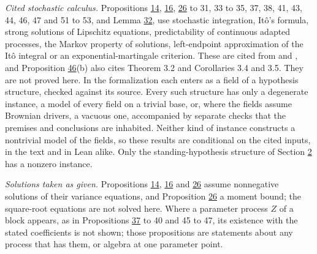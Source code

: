 \documentclass[11pt]{article}
\begin{document}
\emph{Cited stochastic calculus.} Propositions \hyperref[res:Proposition-14]{14}, \hyperref[res:Proposition-16]{16}, \hyperref[res:Proposition-26]{26} to 31, 33 to 35, 37, 38, 41, 43, 44, 46, 47 and 51 to 53, and Lemma \hyperref[res:Lemma-32]{32}, use stochastic integration, Itô's formula, strong solutions of Lipschitz equations, predictability of continuous adapted processes, the Markov property of solutions, left-endpoint approximation of the Itô integral or an exponential-martingale criterion. These are cited from \cite{bauerschmidt2020stochastic} and \cite{vanhandel2007stochastic}, and Proposition \hyperref[res:Proposition-46]{46}(b) also cites \cite{filipovic2000exponential} Theorem 3.2 and Corollaries 3.4 and 3.5. They are not proved here. In the formalization each enters as a field of a hypothesis structure, checked against its source. Every such structure has only a degenerate instance, a model of every field on a trivial base, or, where the fields assume Brownian drivers, a vacuous one, accompanied by separate checks that the premises and conclusions are inhabited. Neither kind of instance constructs a nontrivial model of the fields, so these results are conditional on the cited inputs, in the text and in Lean alike. Only the standing-hypothesis structure of Section \hyperref[sec:2]{2} has a nonzero instance.

\emph{Solutions taken as given.} Propositions \hyperref[res:Proposition-14]{14}, \hyperref[res:Proposition-16]{16} and \hyperref[res:Proposition-26]{26} assume nonnegative solutions of their variance equations, and Proposition \hyperref[res:Proposition-26]{26} a moment bound; the square-root equations are not solved here. Where a parameter process \(Z\) of a block appears, as in Propositions \hyperref[res:Proposition-37]{37} to 40 and 45 to 47, its existence with the stated coefficients is not shown; those propositions are statements about any process that has them, or algebra at one parameter point.
\end{document}
